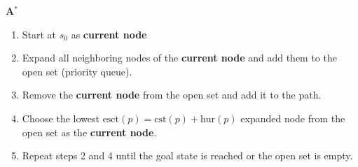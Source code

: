 \begin{process} \textbf{A$^*$}
    \begin{enumerate}
        \item Start at $s_0$ as \textbf{current node}
        \item Expand all neighboring nodes of the \textbf{current node} and add them to the open set (priority queue).
        \item Remove the \textbf{current node} from the open set and add it to the path. 
        \item Choose the lowest $\text{esct}(p) = \text{cst}(p) + \text{hur}(p)$ expanded node from the open set as the \textbf{current node}.
        \item Repeat steps 2 and 4 until the goal state is reached or the open set is empty.
    \end{enumerate}
\end{process}

